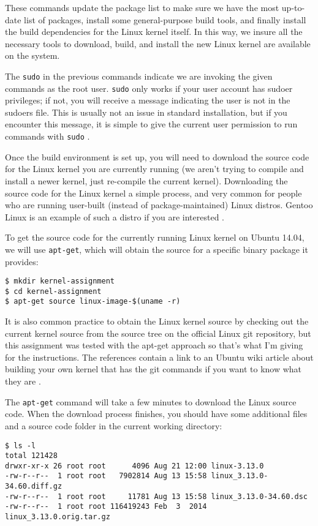 \documentclass[11pt]{article}
\begin{document}
These commands update the package list to make sure we have the most up-to-date list of packages, install some general-purpose build tools, and finally install the build dependencies for the Linux kernel itself. In this way, we insure all the necessary tools to download, build, and install the new Linux kernel are available on the system.

The \texttt{sudo} in the previous commands indicate we are invoking the given commands as the root user. \texttt{sudo} only works if your user account has sudoer privileges; if not, you will receive a message indicating the user is not in the sudoers file. This is usually not an issue in standard installation, but if you encounter this message, it is simple to give the current user permission to run commands with \texttt{sudo} \cite{sudoers}.

Once the build environment is set up, you will need to download the source code for the Linux kernel you are currently running (we aren't trying to compile and install a newer kernel, just re-compile the current kernel). Downloading the source code for the Linux kernel a simple process, and very common for people who are running user-built (instead of package-maintained) Linux distros. Gentoo Linux is an example of such a distro if you are interested \cite{gentoo}.

To get the source code for the currently running Linux kernel on Ubuntu 14.04, we will use \texttt{apt-get}, which will obtain the source for a specific binary package it provides: 

\begin{verbatim}
$ mkdir kernel-assignment
$ cd kernel-assignment
$ apt-get source linux-image-$(uname -r)
\end{verbatim}

It is also common practice to obtain the Linux kernel source by checking out the current kernel source from the source tree on the official Linux git repository, but this assignment was tested with the apt-get approach so that's what I'm giving for the instructions. The references contain a link to an Ubuntu wiki article about building your own kernel that has the git commands if you want to know what they are \cite{ubuntukernel}.

The \texttt{apt-get} command will take a few minutes to download the Linux source code. When the download process finishes, you should have some additional files and a source code folder in the current working directory:

\begin{verbatim}
$ ls -l
total 121428
drwxr-xr-x 26 root root      4096 Aug 21 12:00 linux-3.13.0
-rw-r--r--  1 root root   7902814 Aug 13 15:58 linux_3.13.0-34.60.diff.gz
-rw-r--r--  1 root root     11781 Aug 13 15:58 linux_3.13.0-34.60.dsc
-rw-r--r--  1 root root 116419243 Feb  3  2014 linux_3.13.0.orig.tar.gz
\end{verbatim}
\end{document}
